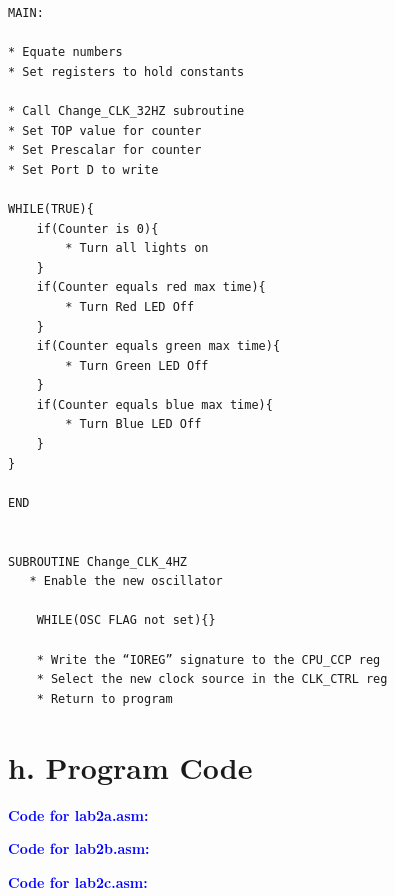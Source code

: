 \documentclass[11pt]{article}
\theoremstyle{plain}
\theoremstyle{definition}
\begin{document}
\begin{tcolorbox}
\begin{verbatim}
MAIN:

* Equate numbers
* Set registers to hold constants

* Call Change_CLK_32HZ subroutine
* Set TOP value for counter
* Set Prescalar for counter
* Set Port D to write

WHILE(TRUE){
    if(Counter is 0){
        * Turn all lights on
    }
    if(Counter equals red max time){
        * Turn Red LED Off
    }
    if(Counter equals green max time){
        * Turn Green LED Off
    }
    if(Counter equals blue max time){
        * Turn Blue LED Off
    }
}

END


SUBROUTINE Change_CLK_4HZ
   * Enable the new oscillator

    WHILE(OSC FLAG not set){}

    * Write the “IOREG” signature to the CPU_CCP reg
    * Select the new clock source in the CLK_CTRL reg
    * Return to program

\end{verbatim}
\end{tcolorbox}

\newpage
\section*{h. Program Code}
\textbf{\textcolor{blue}{Code for lab2a.asm:}}

\newpage
\textbf{\textcolor{blue}{Code for lab2b.asm:}}

\newpage
\textbf{\textcolor{blue}{Code for lab2c.asm:}}

\end{document}
